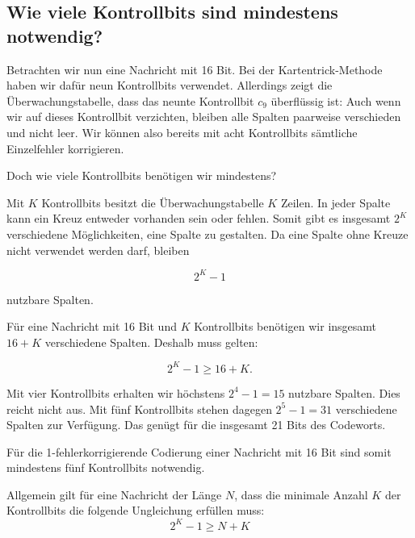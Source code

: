 \subsection*{Wie viele Kontrollbits sind mindestens notwendig?}

Betrachten wir nun eine Nachricht mit 16 Bit. Bei der
Kartentrick-Methode haben wir dafür neun Kontrollbits verwendet.
Allerdings zeigt die Überwachungstabelle, dass das neunte
Kontrollbit \(c_9\) überflüssig ist: Auch wenn wir auf dieses
Kontrollbit verzichten, bleiben alle Spalten paarweise
verschieden und nicht leer. Wir können also bereits mit
acht Kontrollbits sämtliche Einzelfehler korrigieren.

Doch wie viele Kontrollbits benötigen wir mindestens?

Mit \(K\) Kontrollbits besitzt die Überwachungstabelle \(K\) Zeilen.
In jeder Spalte kann ein Kreuz entweder vorhanden sein oder
fehlen. Somit gibt es insgesamt \(2^K\) verschiedene Möglichkeiten,
eine Spalte zu gestalten. Da eine Spalte ohne Kreuze nicht
verwendet werden darf, bleiben

\[
    2^K-1
\]

nutzbare Spalten.

Für eine Nachricht mit 16 Bit und \(K\) Kontrollbits benötigen
wir insgesamt \(16+K\) verschiedene Spalten. Deshalb muss gelten:

\[
    2^K-1\geq 16+K.
\]

Mit vier Kontrollbits erhalten wir höchstens
\(2^4-1=15\) nutzbare Spalten. Dies reicht nicht aus.
Mit fünf Kontrollbits stehen dagegen
\(2^5-1=31\) verschiedene Spalten zur Verfügung.
Das genügt für die insgesamt 21 Bits des Codeworts.

Für die 1-fehlerkorrigierende Codierung einer Nachricht
mit 16 Bit sind somit mindestens fünf Kontrollbits notwendig.

\begin{myremark}
    Allgemein gilt für eine Nachricht der Länge \(N\), dass die
    minimale Anzahl \(K\) der Kontrollbits die folgende Ungleichung
    erfüllen muss:
    \[
        2^K-1\geq N+K
    \]
\end{myremark}


